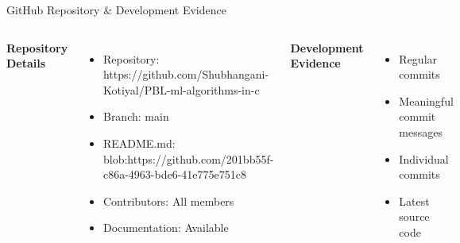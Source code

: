 \documentclass[aspectratio=169,11pt]{beamer}
\begin{document}
\begin{frame}{GitHub Repository \& Development Evidence}

\begin{columns}[T,totalwidth=\textwidth]


\textbf{\color{GEUBlue}Repository Details}

\begin{itemize}\itemsep3pt
    \item Repository: {https://github.com/Shubhangani-Kotiyal/PBL-ml-algorithms-in-c}
    \item Branch: {main}
    \item README.md: blob:https://github.com/201bb55f-c86a-4963-bde6-41e775e751c8
    \item Contributors: {All members}
    \item Documentation: {Available}
\end{itemize}


\textbf{\color{GEUBlue}Development Evidence}

\begin{itemize}\itemsep3pt
    \item {Regular commits}
    \item {Meaningful commit messages}
    \item {Individual commits}
    \item {Latest source code}
\end{itemize}

\end{columns}

\vfill

\end{frame}
\end{document}
